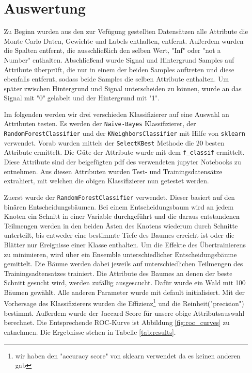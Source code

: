 \section{Auswertung}
\label{sec:auswertung}

Zu Beginn wurden aus den zur Vef\"ugung gestellten Datens\"atzen alle Attribute die Monte Carlo Daten, Gewichte und Labels enthalten, entfernt. Au\ss erdem wurden die Spalten entfernt, die ausschlie\ss lich den selben Wert, "Inf" oder "not a Number" enthalten.
Abschlie\ss end wurde Signal und Hintergrund Samples auf Attribute \"uberpr\"uft, die nur in einem der beiden Samples auftreten und diese ebenfalls entfernt, sodass beide Samples die selben Attribute enthalten.
Um sp\"ater zwischen Hintergrund und Signal unterscheiden zu k\"onnen, wurde an das Signal mit "0" gelabelt und der Hintergrund mit "1".

Im folgenden werden wir drei verschieden Klassifizierer auf eine Auswahl an Attributen testen. Es werden der \texttt{Naive-Bayes} Klassifizierer, der \texttt{RandomForestClassifier} und der \texttt{KNeighborsClassifier} mit Hilfe von \texttt{sklearn} verwendet.
Vorab wurden mittels der \texttt{SelectKBest} Methode die 20 besten Attribute ermittelt. Die G\"ute der Attribute wurde mit dem \texttt{f\_classif} ermittelt.
Diese Attribute sind der beigef\"ugten pdf des verwendeten jupyter Notebooks zu entnehmen.
Aus diesen Attributen wurden Test- und Trainingsdatens\"atze extrahiert, mit welchen die obigen Klassifizierer nun getestet werden.

Zuerst wurde der \texttt{RandomForestClassifier} verwendet. Dieser basiert auf den bin\"aren Entscheidungsb\"aumen.
Bei einem Entscheidungsbaum wird an jedem Knoten ein Schnitt in einer Variable durchgeführt und die daraus entstandenen Teilmengen werden in den beiden Ästen des Knotens wiederum durch Schnitte unterteilt, bis entweder eine bestimmte Tiefe
des Baumes erreicht ist oder die Blätter nur Ereignisse einer Klasse enthalten. Um die Effekte des Übertrainierens zu minimieren, wird über ein Ensemble unterschiedlicher
Entscheidungsbäume gemittelt.
Die Bäume werden dabei jeweils auf unterschiedlichen Teilmengen des Trainingsadtensatzes trainiert.
Die Attribute des Baumes an denen der beste Schnitt gesucht wird, werden zufällig ausgescucht.
Daf\"ur wurde ein Wald mit 100 B\"aumen gew\"ahlt. Alle anderen Parameter wurde mit default initialisiert.
Mit der Vorhersage des Klassifizierers wurden die Effizienz\footnote{wir haben den "accuracy score" von sklearn verwendet da es keinen anderen gab} und die Reinheit("precision") bestimmt.
Au\ss erdem wurde der Jaccard Score f\"ur unsere obige Attributsauswahl berechnet. Die Entsprechende ROC-Kurve ist Abbildung \ref{fig:roc_curves} zu entnehmen.
Die Ergebnisse stehen in Tabelle \ref{tab:results}.

